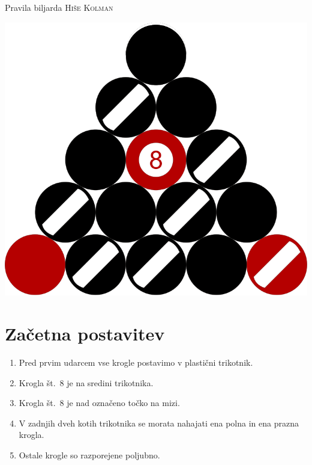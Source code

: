\documentclass[a4paper,14pt]{extarticle}
\newenvironment{Figure}
{\par\medskip\noindent\minipage{\linewidth}}
{\endminipage\par\medskip}
\begin{document}
\vspace{-1.1cm}
\begin{center}
    \Huge Pravila biljarda \textsc{Hiše Kolman}
\end{center}
\begin{multicols}{2}
    \begin{Figure}
    \centering
        \includegraphics[width=.8\textwidth]{trikotnik.png}
        \vspace{-0.5cm}
    \end{Figure}
    \section{Začetna postavitev}
    \begin{enumerate}
        \item Pred prvim udarcem vse krogle postavimo v plastični trikotnik.
        \item Krogla št.~8 je na sredini trikotnika.
        \item Krogla št.~8 je nad označeno točko na mizi.
        \item V zadnjih dveh kotih trikotnika se morata nahajati ena polna in ena prazna krogla.
        \item Ostale krogle so razporejene poljubno.
    \end{enumerate}


\end{multicols}
\end{document}
